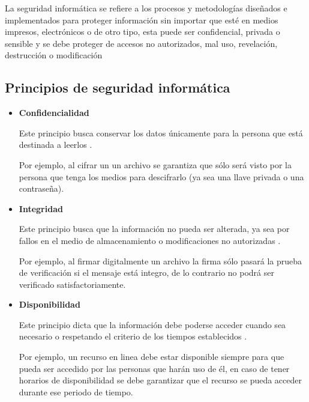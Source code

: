 La seguridad inform\'{a}tica se refiere a los procesos y metodolog\'{i}as dise\~{n}ados e implementados para proteger informaci\'{o}n sin importar que est\'{e} en medios impresos, electr\'{o}nicos o de otro tipo, esta puede ser confidencial, privada o sensible y se debe proteger de accesos no autorizados, mal uso, revelaci\'{o}n, destrucci\'{o}n o modificaci\'{o}n \cite{_sans:_????}

  \subsection {Principios de seguridad inform\'{a}tica}

\begin{itemize}

  \item \textbf{Confidencialidad}

Este principio busca conservar los datos \'{u}nicamente para la persona que est\'{a} destinada a leerlos \cite{_nist_????}\cite{_information_????}.

Por ejemplo, al cifrar un un archivo se garantiza que s\'{o}lo ser\'{a} visto por la persona que tenga los medios para descifrarlo (ya sea una llave privada o una contrase\~{n}a).

  \item \textbf{Integridad}

Este principio busca que la informaci\'{o}n no pueda ser alterada, ya sea por fallos en el medio de almacenamiento o modificaciones no autorizadas \cite{_nist_????}\cite{_information_????}.

Por ejemplo, al firmar digitalmente un archivo la firma s\'{o}lo pasar\'{a} la prueba de verificaci\'{o}n si el mensaje est\'{a} integro, de lo contrario no podr\'{a} ser verificado satisfactoriamente.

  \item \textbf{Disponibilidad}

Este principio dicta que la informaci\'{o}n debe poderse acceder cuando sea necesario o respetando el criterio de los tiempos establecidos \cite{_nist_????}\cite{_information_????}.

Por ejemplo, un recurso en linea debe estar disponible siempre para que pueda ser accedido por las personas que har\'{a}n uso de \'{e}l, en caso de tener horarios de disponibilidad se debe garantizar que el recurso se pueda acceder durante ese periodo de tiempo.

\end{itemize}


